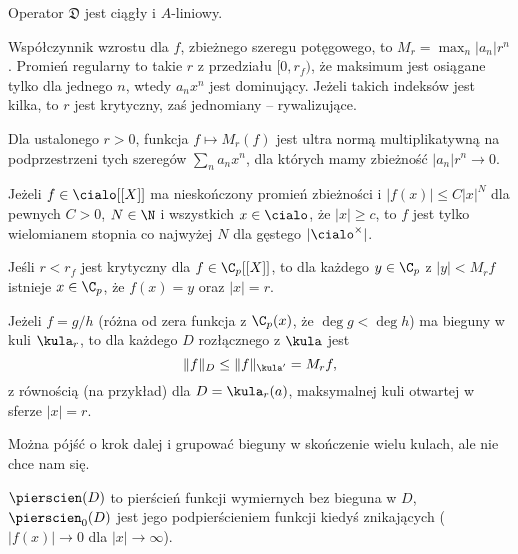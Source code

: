 \begin{fakt}
	Operator $\mathfrak D$ jest ciągły i $A$-liniowy.
\end{fakt}

\begin{definicja}
	Współczynnik wzrostu dla $f$, zbieżnego szeregu potęgowego, to $M_r = \max_n |a_n| r^n$.
	Promień regularny to takie $r$ z przedziału $[0, r_f)$, że maksimum jest osiągane tylko dla jednego $n$, wtedy $a_n x^n$ jest dominujący.
	Jeżeli takich indeksów jest kilka, to $r$ jest krytyczny, zaś jednomiany -- rywalizujące.
\end{definicja}

\begin{fakt}
	Dla ustalonego $r > 0$, funkcja $f \mapsto M_r(f)$ jest ultra normą multiplikatywną na podprzestrzeni tych szeregów $\sum_n a_n x^n$, dla których mamy zbieżność $|a_n|r^n \to 0$.
\end{fakt}

\begin{twierdzenie}[Liouville]
	Jeżeli $f \in \cialo[[X]]$ ma nieskończony promień zbieżności i $|f(x)| \le C|x|^N$ dla pewnych $C > 0$, $N \in \N$ i wszystkich $x \in \cialo$, że $|x| \ge c$, to $f$ jest tylko wielomianem stopnia co najwyżej $N$ dla gęstego $|\cialo^\times|$.
\end{twierdzenie}

\begin{fakt}
	Jeśli $r < r_f$ jest krytyczny dla $f \in \C_p[[X]]$, to dla każdego $y \in \C_p$ z $|y| < M_rf$ istnieje $x \in \C_p$, że $f(x) = y$ oraz $|x| = r$.
\end{fakt}

\begin{fakt}
	Jeżeli $f = g/h$ (różna od zera funkcja z $\C_p(x)$, że $\deg g < \deg h$) ma bieguny w kuli $\kula_r$, to dla każdego $D$ rozłącznego z $\kula$ jest
	\[
		\|f\|_D \le \|f\|_{\kula'} = M_r f,
	\]
	z równością (na przykład) dla $D = \kula_r(a)$, maksymalnej kuli otwartej w sferze $|x| = r$.
\end{fakt}

Można pójść o krok dalej i grupować bieguny w skończenie wielu kulach, ale nie chce nam się.

\begin{definicja}
	$\pierscien(D)$ to pierścień funkcji wymiernych bez bieguna w $D$, $\pierscien_0(D)$ jest jego podpierścieniem funkcji kiedyś znikających ($|f(x)| \to 0$ dla $|x| \to \infty$).
\end{definicja}

